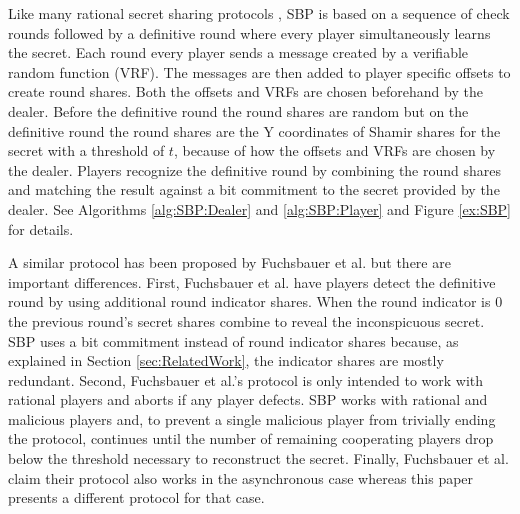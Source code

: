 \documentclass{dalcsthesis}
\begin{document}
Like many rational secret sharing protocols \cite{halpern04, kol08, fuch10}, SBP is based on a sequence of check rounds followed by a definitive round where every player simultaneously learns the secret. Each round every player sends a message created by a verifiable random function (VRF). The messages are then added to player specific offsets to create round shares. Both the offsets and VRFs are chosen beforehand by the dealer. Before the definitive round the round shares are random but on the definitive round the round shares are the Y coordinates of Shamir shares for the secret with a threshold of $t$, because of how the offsets and VRFs are chosen by the dealer. Players recognize the definitive round by combining the round shares and matching the result against a bit commitment to the secret provided by the dealer. See Algorithms \ref{alg:SBP:Dealer} and \ref{alg:SBP:Player} and Figure \ref{ex:SBP} for details.

A similar protocol has been proposed by Fuchsbauer et al. \cite{fuch10} but there are important differences. First, Fuchsbauer et al. have players detect the definitive round by using additional round indicator shares. When the round indicator is 0 the previous round's secret shares combine to reveal the inconspicuous secret. SBP uses a bit commitment instead of round indicator shares because, as explained in Section \ref{sec:RelatedWork}, the indicator shares are mostly redundant. Second, Fuchsbauer et al.'s protocol is only intended to work with rational players and aborts if any player defects. SBP works with rational and malicious players and, to prevent a single malicious player from trivially ending the protocol, continues until the number of remaining cooperating players drop below the threshold necessary to reconstruct the secret. Finally, Fuchsbauer et al. claim their protocol also works in the asynchronous case whereas this paper presents a different protocol for that case.
\end{document}
